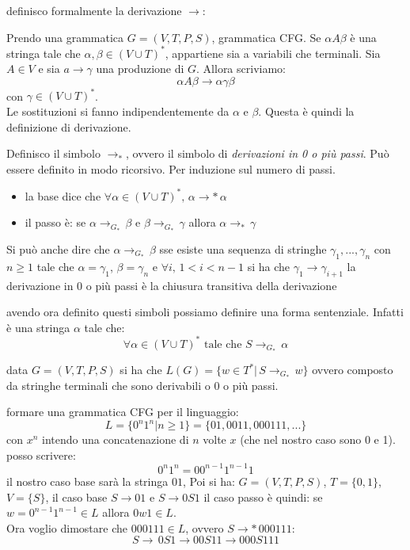 definisco formalmente la derivazione $\to$:
\begin{definition}
	Prendo una grammatica $G=(V,T,P,S)$, grammatica CFG. Se $\alpha A \beta$ è una stringa tale che $\alpha,\beta\in (V\cup T)^*$, appartiene sia a variabili che terminali. Sia $A\in V$ e sia $a\to \gamma$ una produzione di $G$. Allora
	scriviamo:
	$$\alpha A \beta \to \alpha\gamma\beta$$
	con $\gamma\in (V\cup T)^*$.\\
	Le sostituzioni si fanno indipendentemente da $\alpha$ e $\beta$.
	Questa è quindi la definizione di derivazione.
\end{definition}
\begin{definition}
	Definisco il simbolo $\to _*$, ovvero il simbolo di \textit{derivazioni in 0 o più passi}. Può essere definito in modo ricorsivo. Per induzione sul numero di passi.
	\begin{itemize}
		\item la base dice che  $\forall \alpha\in (V\cup T)^*,\, \alpha\to * \,\alpha$
		\item il passo è: se $\alpha\to_{G_*} \,\beta $ e $ \beta \to_{G_*} \,\gamma$ allora $\alpha\to_* \,\gamma$
	\end{itemize}
	Si può anche dire che $\alpha\to_{G_*}\, \beta$ sse esiste una sequenza di stringhe $\gamma_1,...,\gamma_n$ con $n\geq 1$ tale che $\alpha=\gamma_1$, $\beta=\gamma_n$ e $\forall i,\, 1<i<n-1$ si ha che $\gamma_1\to \gamma_{i+1}$
	la derivazione in 0 o più passi è la chiusura transitiva della derivazione
\end{definition}
\begin{definition}
	avendo ora definito questi simboli possiamo definire una forma sentenziale. Infatti è una stringa $\alpha$ tale che:
	$$\forall \alpha\in (V\cup T)^* \mbox{ tale che }S\to_{G_*}\, \alpha$$
\end{definition}
\begin{definition}
	data $G=(V,T,P,S)$ si ha che $L(G)=\{w\in T^* |\, S\to_{G_*}\, w\}$ ovvero composto da stringhe terminali che sono derivabili o 0 o più passi.
\end{definition}
\begin{example}
	formare una grammatica CFG per il linguaggio:
	$$L=\{0^n 1^n| n\geq 1\}=\{01, 0011, 000111,...\}$$
	con $x^n$ intendo una concatenazione di $n$ volte $x$ (che nel nostro caso sono 0 e 1).\\
	posso scrivere:
	$$0^n 1^n =00^{n-1} 1^{n-1}1$$
	il nostro caso base sarà la stringa $01$, Poi si ha:
	$G=(V,T,P,S)$, $T=\{0,1\}$, $V=\{S\}$, il caso base $S\to 01$  e $S\to 0S1$
	il caso passo è quindi: se $w= 0^{n-1}1^{n-1}\in L$ allora $0w1\in L$.\\
	Ora voglio dimostare che $000111\in L$, ovvero $S\to*\, 000111$:\\
	$$S\to\, 0S1 \to 00S11\to 000S111$$
\end{example}
